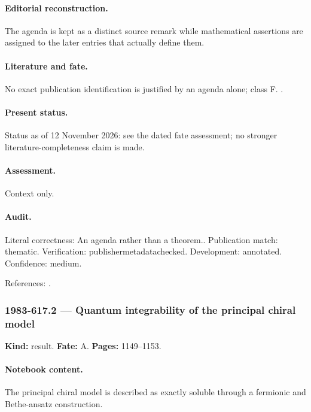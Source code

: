 \paragraph{Editorial reconstruction.} The agenda is kept as a distinct source remark while mathematical assertions are assigned to the later entries that actually define them.

\paragraph{Literature and fate.} No exact publication identification is justified by an agenda alone; class F. \citep{wiegmann1984sun}.

\paragraph{Present status.} Status as of 12 November 2026: see the dated fate assessment; no stronger literature-completeness claim is made.

\paragraph{Assessment.} Context only.

\paragraph{Audit.} Literal correctness: An agenda rather than a theorem.. Publication match: thematic. Verification: publishermetadatachecked. Development: annotated. Confidence: medium.

\noindent References: \citep{wiegmann1984sun}.\par

\subsubsection{1983-617.2 --- Quantum integrability of the principal chiral model}

\label{item:1983-617.2}

\noindent\textbf{Kind:} result. \textbf{Fate:} A. \textbf{Pages:} 1149--1153.\par

\paragraph{Notebook content.} The principal chiral model is described as exactly soluble through a fermionic and Bethe-ansatz construction.

